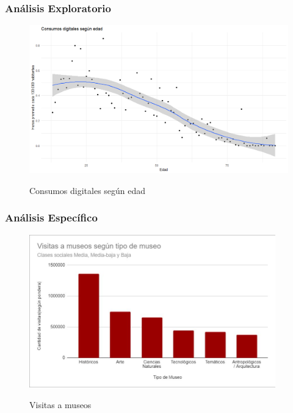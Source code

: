 \documentclass[10pt]{beamer}
\begin{document}
\begin{frame}
  \frametitle{Análisis Exploratorio}
  \begin{figure}
    \includegraphics[width=\textwidth]{consumos_digitales.png}
    \label{fig:digitales}
    \caption{Consumos digitales según edad}
    \end{figure}
\end{frame}

\begin{frame}
  \frametitle{Análisis Específico}
  \begin{figure}
    \includegraphics[width=0.95\textwidth]{visitas.jpg}
    \label{fig:visitas}
    \caption{Visitas a museos}
    \end{figure}
  \end{frame}
\end{document}
